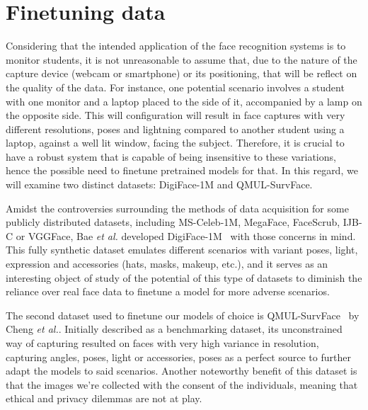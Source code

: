 \documentclass[class=report, crop=false, a4paper, 12pt]{standalone}
\begin{document}
\section{Finetuning data}
Considering that the intended application of the face recognition systems is to monitor students, it is not unreasonable to assume that, due to the nature of the capture device (webcam or smartphone) or its positioning, that will be reflect on the quality of the data. For instance, one potential scenario involves a student with one monitor and a laptop placed to the side of it, accompanied by a lamp on the opposite side. This will configuration will result in face captures with very different resolutions, poses and lightning compared to another student using a laptop, against a well lit window, facing the subject. Therefore, it is crucial to have a robust system that is capable of being insensitive to these variations, hence the possible need to finetune pretrained models for that. In this regard, we will examine two distinct datasets: DigiFace-1M and QMUL-SurvFace.
\par Amidst the controversies surrounding the methods of data acquisition for some publicly distributed datasets, including MS-Celeb-1M, MegaFace, FaceScrub, IJB-C or VGGFace, Bae \textit{et al.} developed DigiFace-1M~\autocite{baeDigiFace1MMillionDigital2023} with those concerns in mind. This fully synthetic dataset emulates different scenarios with variant poses, light, expression and accessories (hats, masks, makeup, etc.), and it serves as an interesting object of study of the potential of this type of datasets to diminish the reliance over real face data to finetune a model for more adverse scenarios.
\par The second dataset used to finetune our models of choice is QMUL-SurvFace~\autocite{chengSurveillanceFaceRecognition2018} by Cheng \textit{et al.}. Initially described as a benchmarking dataset, its unconstrained way of capturing resulted on faces with very high variance in resolution, capturing angles, poses, light or accessories, poses as a perfect source to further adapt the models to said scenarios. Another noteworthy benefit of this dataset is that the images we're collected with the consent of the individuals, meaning that ethical and privacy dilemmas are not at play.
\end{document}
